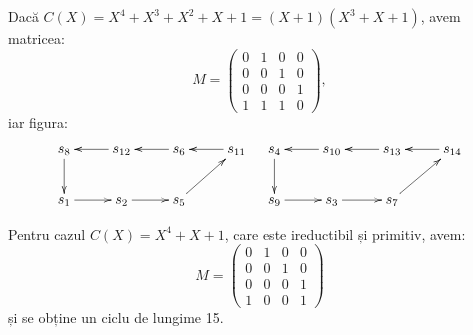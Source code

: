 \begin{example}
  Dacă $ C(X) = X^4 + X^3 + X^2 + X + 1 = (X + 1)(X^3 + X + 1) $,
  avem matricea:
  \[
    M = \begin{pmatrix}
      0 & 1 & 0 & 0 \\
      0 & 0 & 1 & 0 \\
      0 & 0 & 0 & 1 \\
      1 & 1 & 1 & 0
    \end{pmatrix},
  \]
  iar figura:
  \[
    \xymatrix{
      s_8 \ar[d] & s_{12} \ar[l] & s_6 \ar[l] & s_{11} \ar[l] \\
      s_1 \ar[r] & s_2 \ar[r] & s_5 \ar[ur] &
    } \quad
    \xymatrix{
      s_4 \ar[d] & s_{10} \ar[l] & s_{13} \ar[l] & s_{14} \ar[l] \\
      s_9 \ar[r] & s_3 \ar[r] & s_7 \ar[ur] &
    }
  \]
\end{example}

\begin{example}
  Pentru cazul $ C(X) = X^4 + X + 1 $, care este ireductibil și primitiv,
  avem:
  \[
    M = \begin{pmatrix}
      0 & 1 & 0 & 0 \\
      0 & 0 & 1 & 0 \\
      0 & 0 & 0 & 1 \\
      1 & 0 & 0 & 1
    \end{pmatrix}
  \]
  și se obține un ciclu de lungime 15.
\end{example}

